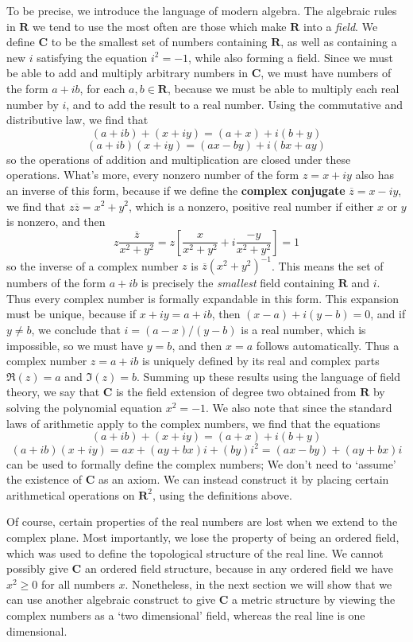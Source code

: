 To be precise, we introduce the language of modern algebra. The algebraic rules in $\mathbf{R}$ we tend to use the most often are those which make $\mathbf{R}$ into a {\it field}. We define $\mathbf{C}$ to be the smallest set of numbers containing $\mathbf{R}$, as well as containing a new $i$ satisfying the equation $i^2 = -1$, while also forming a field. Since we must be able to add and multiply arbitrary numbers in $\mathbf{C}$, we must have numbers of the form $a + ib$, for each $a,b \in \mathbf{R}$, because we must be able to multiply each real number by $i$, and to add the result to a real number. Using the commutative and distributive law, we find that
%
\[ (a + ib) + (x + iy) = (a + x) + i(b + y) \]
\[ (a + ib)(x + iy) = (ax - by) + i(bx + ay) \]
%
so the operations of addition and multiplication are closed under these operations. What's more, every nonzero number of the form $z = x + iy$ also has an inverse of this form, because if we define the {\bf complex conjugate} $\overline{z} = x - iy$, we find that $z\overline{z} = x^2 + y^2$, which is a nonzero, positive real number if either $x$ or $y$ is nonzero, and then
%
\[ z \frac{\overline{z}}{x^2 + y^2} = z \left[ \frac{x}{x^2 + y^2} + i \frac{-y}{x^2 + y^2} \right] = 1 \]
%
so the inverse of a complex number $z$ is $\overline{z}(x^2 + y^2)^{-1}$. This means the set of numbers of the form $a + ib$ is precisely the {\it smallest} field containing $\mathbf{R}$ and $i$. Thus every complex number is formally expandable in this form. This expansion must be unique, because if $x + iy = a + ib$, then $(x - a) + i(y-b) = 0$, and if $y \neq b$, we conclude that $i = (a-x)/(y-b)$ is a real number, which is impossible, so we must have $y = b$, and then $x = a$ follows automatically. Thus a complex number $z = a + ib$ is uniquely defined by its real and complex parts $\Re(z) = a$ and $\Im(z) = b$. Summing up these results using the language of field theory, we say that $\mathbf{C}$ is the field extension of degree two obtained from $\mathbf{R}$ by solving the polynomial equation $x^2 = -1$. We also note that since the standard laws of arithmetic apply to the complex numbers, we find that the equations
%
\[ (a + ib) + (x + iy) = (a + x) + i(b + y) \]
\[ (a + ib)(x + iy) = ax + (ay + bx)i + (by)i^2 = (ax - by) + (ay + bx)i \]
%
can be used to formally define the complex numbers; We don't need to `assume' the existence of $\mathbf{C}$ as an axiom. We can instead construct it by placing certain arithmetical operations on $\mathbf{R}^2$, using the definitions above.

Of course, certain properties of the real numbers are lost when we extend to the complex plane. Most importantly, we lose the property of being an ordered field, which was used to define the topological structure of the real line. We cannot possibly give $\mathbf{C}$ an ordered field structure, because in any ordered field we have $x^2 \geq 0$ for all numbers $x$. Nonetheless, in the next section we will show that we can use another algebraic construct to give $\mathbf{C}$ a metric structure by viewing the complex numbers as a `two dimensional' field, whereas the real line is one dimensional.

